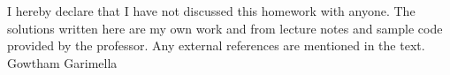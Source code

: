 \vfill
\begin{acknowledgements}
I hereby declare that I have not discussed this homework with anyone. The solutions written here are
my own work and  from lecture notes and sample code provided by the professor. Any 
external references are mentioned in the text.
\flushright Gowtham Garimella
\end{acknowledgements}





